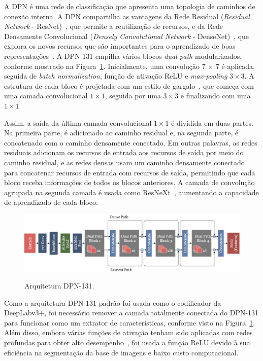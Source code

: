 A DPN é uma rede de classificação que apresenta uma topologia de caminhos de conexão interna. A DPN compartilha as vantagens da Rede Residual (\textit{Residual Network} - ResNet)~\cite{He7780459}, que permite a reutilização de recursos, e da Rede Densamente Convolucional (\textit{Densely Convolutional Network} - DenseNet)~\cite{Huang8099726}, que explora os novos recursos que são importantes para o aprendizado de boas representações~\cite{chen2017dual}. A DPN-131 empilha vários blocos \textit{dual path} modularizados, conforme mostrado na Figura~\ref{fig:arquitetura_DPN}. Inicialmente, uma convolução 7 × 7 é aplicada, seguida de \textit{batch normalization}, função de ativação ReLU e \textit{max-pooling} $3\times3$. A estrutura de cada bloco é projetada com um estilo de gargalo~\cite{He7780459}, que começa com uma camada convolucional $1\times1$, seguida por uma $3\times3$ e finalizando com uma $1\times1$.

Assim, a saída da última camada convolucional $1\times1$ é dividida em duas partes. Na primeira parte, é adicionado ao caminho residual e, na segunda parte, é concatenado com o caminho densamente conectado. Em outras palavras, as redes residuais adicionam os recursos de entrada aos recursos de saída por meio do caminho residual, e as redes densas usam um caminho densamente conectado para concatenar recursos de entrada com recursos de saída, permitindo que cada bloco receba informações de todos os blocos anteriores. A camada de convolução agrupada na segunda camada é usada como ResNeXt~\cite{xie2017aggregated}, aumentando a capacidade de aprendizado de cada bloco.

\begin{figure}[!ht]
    \centering
    \caption{Arquitetura DPN-131.}
    \includegraphics[width=1\textwidth]{figuras/arquitetura_DPN.png}
    \label{fig:arquitetura_DPN}
\end{figure}

Como a arquitetura DPN-131 padrão foi usada como o codificador da DeepLabv3+, foi necessário remover a camada totalmente conectada do DPN-131 para funcionar como um extrator de características, conforme visto na Figura~\ref{fig:arquitetura_DPN}. Além disso, embora várias funções de ativação tenham sido aplicadas com redes profundas para obter alto desempenho~\cite{8936083, GOCERI2021104118}, foi usada a função ReLU devido à sua eficiência na segmentação da base de imagens e baixo custo computacional.

